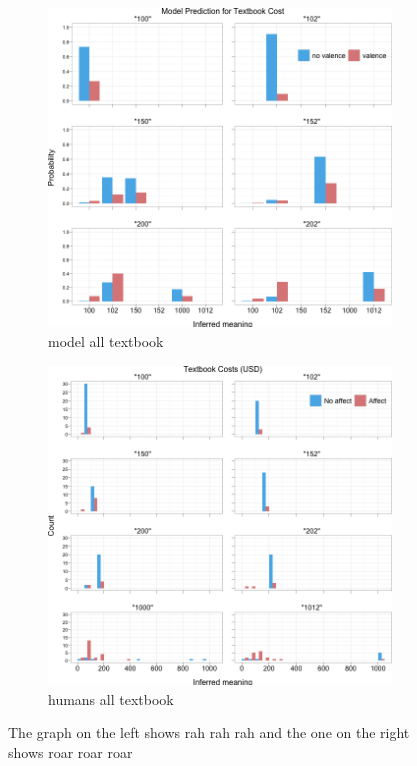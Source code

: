 \documentclass{article} %
\begin{document}
\begin{figure}
        \begin{subfigure}[b]{0.5\textwidth}
                \centering
		\includegraphics[width=\textwidth]{model_all_textbook.png}
		\caption{model all textbook}
	\end{subfigure}
        \begin{subfigure}[b]{0.5\textwidth}
                \centering
                \includegraphics[width=\textwidth]{humans_all_textbook.png}
		\caption{humans all textbook}
	\end{subfigure}
	\caption{The graph on the left shows rah rah rah and the one on the right shows roar roar roar}
\end{figure}
\end{document}
